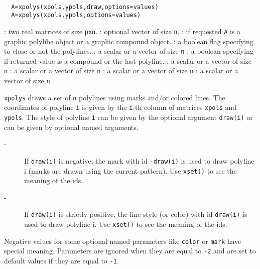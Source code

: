 \begin{mandesc}
  \\ %
\end{mandesc}
\begin{calling_sequence}
\begin{verbatim}
  A=xpolys(xpols,ypols,draw,options=values)
  A=xpolys(xpols,ypols,options=values)
\end{verbatim}
\end{calling_sequence}

\begin{parameters}
  \begin{varlist}
    : two real matrices of size \verb!pxn!.
    : optional vector of size \verb!n!.
    : if requested \verb!A! is a graphic polylibe object or a graphic compound object.
    : a boolean flag specifying to close or not the polylines.
    : a scalar or a vector of size \verb!n!
    : a boolean  specifying if returned value is a compound or the last polyline.
    :  a scalar or a vector of size \verb!n!
    : a scalar or a vector of size \verb!n!
    :  a scalar or a vector of size \verb!n!
    :  a scalar or a vector of size \verb!n!
  \end{varlist}
\end{parameters}
\begin{mandescription}
  \verb!xpolys! draws a set of \verb!n! polylines using marks and/or colored lines.
  The coordinates of polyline \verb!i! is given by the \verb!i!-th
  column of matrices \verb!xpols! and \verb!ypols!.
  The style of polyline \verb!i! can be given by the optional argument \verb!draw(i)!
  or can be given by optional named arguments.

  \begin{description}
  \item[-] If \verb!draw(i)! is negative, the mark with id \verb!-draw(i)! is
    used to draw polyline i (marks are drawn using the current pattern). Use
    \verb!xset()! to see the meaning of the ids.
  \item[-] If \verb!draw(i)! is strictly positive, the line style (or color)
    with id \verb!draw(i)! is used to draw polyline i. Use \verb!xset()! to see
    the meaning of the ids.
  \end{description}

  Negative values for some optional named parameters like \verb!color! or
  \verb!mark! have special meaning.
  Parameters are ignored when they are equal to \verb!-2!
  and are set to default values if they are equal to \verb!-1!.
\end{mandescription}

